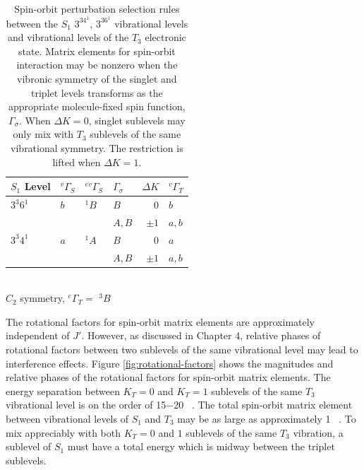 \begin{table}
  \caption{Spin-orbit perturbation selection rules between the $S_1$ $3^34^1$, 
    $3^36^1$ vibrational levels and vibrational levels of the $T_3$ 
    electronic state. Matrix elements for spin-orbit interaction may 
    be nonzero when the vibronic symmetry of the singlet and triplet 
    levels transforms as the appropriate molecule-fixed spin function,
    $\Gamma_{\sigma}$.  When $\Delta K = 0$, singlet sublevels may only 
    mix with $T_3$ sublevels of the same vibrational symmetry.  The 
    restriction is lifted when $\Delta K=1$.
  }
  \label{table:delta-k}
  \centering
  \begin{tabular}{llllrl}
    \\
    $S_1$ Level
    & $^{v}\Gamma_S$ & $^{ev}\Gamma_S$ & $\Gamma_\sigma$ & $\Delta K$ & $^{v}\Gamma_T$ \\
    \midrule
    
    $3^3 6^1$ 
    & $b$ & $^{1}B$ & $B$ & $0$ & $b$ \\
    & & & $A, B$ & $\pm1$ & $a, b$ \\
    
    $3^3 4^1$ 
    & $a$ & $^{1}A$ & $B$ & $0$ & $a$ \\
    & & & $A, B$ & $\pm1$ & $a, b$ \\[10pt]
    
  \end{tabular}\\[5mm]
  
  $C_{2}$ symmetry, $^{e}\Gamma_T =$ $^{3}B$
\end{table}

The rotational factors for spin-orbit matrix elements are
approximately independent of $J'$.  However, as discussed in Chapter
4, relative phases of rotational factors between two sublevels of the
same vibrational level may lead to interference effects.  Figure
\ref{fig:rotational-factors} shows the magnitudes and relative phases of
the rotational factors for spin-orbit matrix elements.  The energy
separation between $K_T=0$ and $K_T=1$ sublevels of the same $T_3$
vibrational level is on the order of 15$-$20 \rcm\ \cite{thom07}.  The total
spin-orbit matrix element between vibrational levels of $S_1$ and
$T_3$ may be as large as approximately 1 \rcm\ \cite{thom07}.  To mix
appreciably with both $K_T=0$ and $1$ sublevels of the same $T_3$
vibration, a sublevel of $S_1$ must have a total energy which is
midway between the triplet sublevels.


